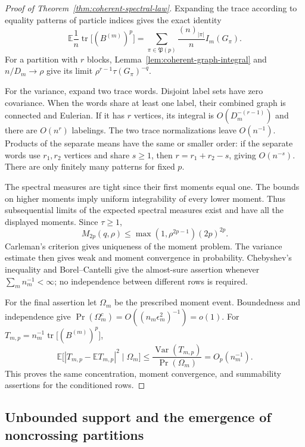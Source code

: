 \begin{proof}[Proof of Theorem~\ref{thm:coherent-spectral-law}]
Expanding the trace according to equality patterns of particle
indices gives the exact identity
\begin{equation}
 \mathbb E\frac1n\operatorname{tr}\bigl[(B^{(m)})^p\bigr]
 =\sum_{\pi\in\mathfrak P(p)}
       \frac{(n)_{|\pi|}}n I_m(G_\pi).
 \label{eq:coherent-exact-trace-expansion}
\end{equation}
For a partition with $r$ blocks, Lemma~\ref{lem:coherent-graph-integral}
and $n/D_m\to\rho$ give its limit
$\rho^{r-1}\tau(G_\pi)^{-q}$.

For the variance, expand two trace words.  Disjoint label sets have
zero covariance.  When the words share at least one label, their
combined graph is connected and Eulerian.  If it has $r$ vertices,
its integral is $O(D_m^{-(r-1)})$ and there are $O(n^r)$ labelings.
The two trace normalizations leave $O(n^{-1})$.  Products of the
separate means have the same or smaller order: if the separate words
use $r_1,r_2$ vertices and share $s\geq1$, then
$r=r_1+r_2-s$, giving $O(n^{-s})$.  There are only finitely many
patterns for fixed $p$.

The spectral measures are tight since their first moments equal one.
The bounds on higher moments imply uniform integrability of every
lower moment.  Thus subsequential limits of the expected spectral
measures exist and have all the displayed moments.  Since
$\tau\geq1$,
\[
 M_{2p}(q,\rho)
 \leq \max(1,\rho^{2p-1})(2p)^{2p}.
\]
Carleman's criterion gives uniqueness of the moment problem.
The variance estimate then gives weak and moment convergence in
probability.  Chebyshev's inequality and Borel--Cantelli give the
almost-sure assertion whenever $\sum_m n_m^{-1}<\infty$; no
independence between different rows is required.

For the final assertion let $\Omega_m$ be the prescribed moment
event.  Boundedness and independence give
$\Pr(\Omega_m^c)=O((n_m\epsilon_m^2)^{-1})=o(1)$.
For $T_{m,p}=n_m^{-1}\operatorname{tr}\bigl[(B^{(m)})^p\bigr]$,
\[
 \mathbb E\bigl[|T_{m,p}-\mathbb ET_{m,p}|^2\mid\Omega_m\bigr]
 \leq\frac{\operatorname{Var}(T_{m,p})}{\Pr(\Omega_m)}
 =O_p(n_m^{-1}).
\]
This proves the same concentration, moment convergence, and
summability assertions for the conditioned rows.
\end{proof}

\subsection{Unbounded support and the emergence of noncrossing partitions}

